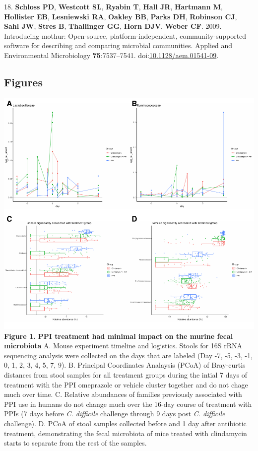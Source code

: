 \documentclass[11pt,]{article}
\begin{document}
\hypertarget{ref-Schloss2009}{}
18. \textbf{Schloss PD}, \textbf{Westcott SL}, \textbf{Ryabin T},
\textbf{Hall JR}, \textbf{Hartmann M}, \textbf{Hollister EB},
\textbf{Lesniewski RA}, \textbf{Oakley BB}, \textbf{Parks DH},
\textbf{Robinson CJ}, \textbf{Sahl JW}, \textbf{Stres B},
\textbf{Thallinger GG}, \textbf{Horn DJV}, \textbf{Weber CF}. 2009.
Introducing mothur: Open-source, platform-independent,
community-supported software for describing and comparing microbial
communities. Applied and Environmental Microbiology
\textbf{75}:7537--7541.
doi:\href{https://doi.org/10.1128/aem.01541-09}{10.1128/aem.01541-09}.

\newpage

\subsection{Figures}\label{figures}

\includegraphics{figure_1.pdf} \textbf{Figure 1. PPI treatment had
minimal impact on the murine fecal microbiota} A. Mouse experiment
timeline and logistics. Stools for 16S rRNA sequencing analysis were
collected on the days that are labeled (Day -7, -5, -3, -1, 0, 1, 2, 3,
4, 5, 7, 9). B. Principal Coordinates Analaysis (PCoA) of Bray-curtis
distances from stool samples for all treatment groups during the intial
7 days of treatment with the PPI omeprazole or vehicle cluster together
and do not chage much over time. C. Relative abundances of families
previously associated with PPI use in humans do not change much over the
16-day course of treatment with PPIs (7 days before \emph{C. difficile}
challenge through 9 days post \emph{C. difficile} challenge). D. PCoA of
stool samples collected before and 1 day after antibiotic treatment,
demonstrating the fecal microbiota of mice treated with clindamycin
starts to separate from the rest of the samples.
\end{document}
